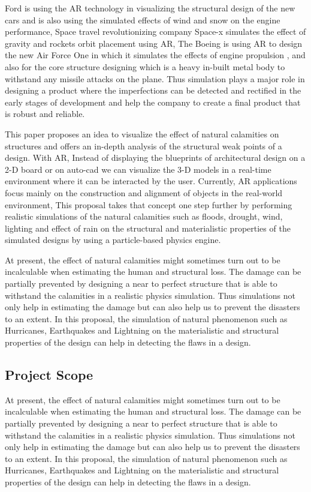 \documentclass[BTech]{srmuthesis}
\begin{document}
Ford is using the AR technology in visualizing the structural design of the new cars and is also using the simulated effects of wind and snow on 
the engine performance, Space travel revolutionizing company Space-x simulates the effect of gravity and rockets orbit placement using AR, 
The Boeing is using AR to design the new Air Force One in which it simulates the effects of engine propulsion , and also for the core structure designing which is a heavy in-built metal body to withstand any missile attacks on the plane. Thus simulation plays a major role in designing a product where the imperfections can be detected and rectified in the early stages of development and help the company to create a final product that is robust and reliable.

This paper proposes an idea to visualize the effect of natural calamities on structures and offers an in-depth analysis of the structural weak points of a design. With AR, Instead of displaying the blueprints of architectural design on a 2-D board or on auto-cad we can visualize the 3-D models in a real-time environment where it can be interacted by the user. Currently, AR applications focus mainly on the construction and alignment of objects in the real-world environment, This proposal takes that concept one step further by performing realistic simulations of the natural calamities such as floods,  drought, wind, lighting and effect of rain on the structural and materialistic properties of the simulated designs by using a particle-based physics engine. 

At present, the effect of natural calamities might sometimes turn out to be incalculable when estimating the human and structural loss. The damage can be partially prevented by designing a near to perfect structure that is able to withstand the calamities in a realistic physics simulation. Thus simulations not only help in estimating the damage but can also help us to prevent the disasters to an extent. In this proposal, the simulation of natural phenomenon such as Hurricanes, Earthquakes and Lightning on the materialistic and structural properties of the design can help in detecting the flaws in a design.

\subsection{Project Scope}
At present, the effect of natural calamities might sometimes turn out to be incalculable when estimating the human and structural loss. The damage can be partially prevented by designing a near to perfect structure that is able to withstand the calamities in a realistic physics simulation. Thus simulations not only help in estimating the damage but can also help us to prevent the disasters to an extent. In this proposal, the simulation of natural phenomenon such as Hurricanes, Earthquakes and Lightning on the materialistic and structural properties of the design can help in detecting the flaws in a design.
\end{document}
